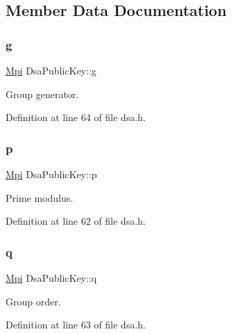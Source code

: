 \subsection{Member Data Documentation}
\mbox{\label{structDsaPublicKey_a910d43db2650efb256373b06521a23bf}} 
\subsubsection{\texorpdfstring{g}{g}}
{\footnotesize\ttfamily \hyperlink{structMpi}{Mpi} Dsa\+Public\+Key\+::g}



Group generator. 



Definition at line 64 of file dsa.\+h.

\mbox{\label{structDsaPublicKey_a273f5bed06a946fd672c94283f49fc3e}} 
\subsubsection{\texorpdfstring{p}{p}}
{\footnotesize\ttfamily \hyperlink{structMpi}{Mpi} Dsa\+Public\+Key\+::p}



Prime modulus. 



Definition at line 62 of file dsa.\+h.

\mbox{\label{structDsaPublicKey_a7961fbb82f0c5c56b577d2247ffc9172}} 
\subsubsection{\texorpdfstring{q}{q}}
{\footnotesize\ttfamily \hyperlink{structMpi}{Mpi} Dsa\+Public\+Key\+::q}



Group order. 



Definition at line 63 of file dsa.\+h.

\mbox{\label{structDsaPublicKey_a47d0a3368a5a61e48cc36ed0414392a6}} 

